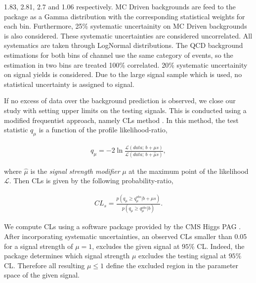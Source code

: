 1.83, 2.81, 2.7 and 1.06 respectively.
MC Driven backgrounds are feed to the package as a Gamma distribution with the corresponding statistical weights for each bin.
Furthermore, 25\% systematic uncertainity on MC Driven backgrounds is also considered. These systematic uncertainties are considered uncorrelated.
All systematics are taken through LogNormal distributions. 
The QCD background estimations for 
both bins of \tauTau channel use the same category of events, so the estimation in two bins are treated 100\% correlated.
20\% systematic uncertainity on signal yields is considered. 
Due to the large signal sample which is used, no statistical uncertainty is assigned to signal.

If no excess of data over the background prediction is observed, 
we close our study with setting upper limits on the testing signals.
This is conducted using a modified frequentist approach, namely CLs method \cite{read:CLs}.
In this method, the test statistic $q_\mu$ 
is a function of the profile likelihood-ratio,

\begin{align}
q_\mu = -2 \ln \frac{\mathcal{L}(data ;\, b + \mu s)}{\mathcal{L}(data ;\, b + \hat{\mu} s)},
\end{align}

where $\hat\mu$ is the \textit{signal strength modifier} $\mu$ at the maximum point of the likelihood $\mathcal{L}$.
Then CLs is given by the following probability-ratio,

\begin{align}
CL_s = \frac{p(q_\mu \geq q_\mu^{obs} | b + \mu s )}{p(q_\mu \geq q_\mu^{obs} | b)}.
\end{align}
 
We compute CLs using a software package provided by the CMS Higgs PAG \cite{higgspag:software}.
After incorporating systematic uncertainties, an observed CLs smaller than 0.05 for a signal strength of $\mu = 1$, excludes the given signal at $95\%$ CL. Indeed, the package determines which signal strength $\mu$ excludes the testing signal at $95\%$ CL. Therefore all resulting $\mu \leq 1$ define the excluded region in the parameter space of the given signal. 


